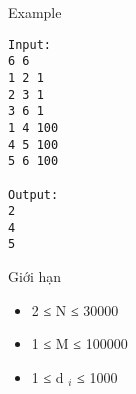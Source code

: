 Example
\begin{verbatim}
Input:
6 6
1 2 1
2 3 1
3 6 1
1 4 100
4 5 100
5 6 100

Output:
2
4 
5

\end{verbatim}
Giới hạn
\begin{itemize}
	\item     2 ≤ N ≤ 30000   
	\item     1 ≤ M ≤ 100000   
	\item     1 ≤ d    $_     i    $    ≤ 1000   
\end{itemize}